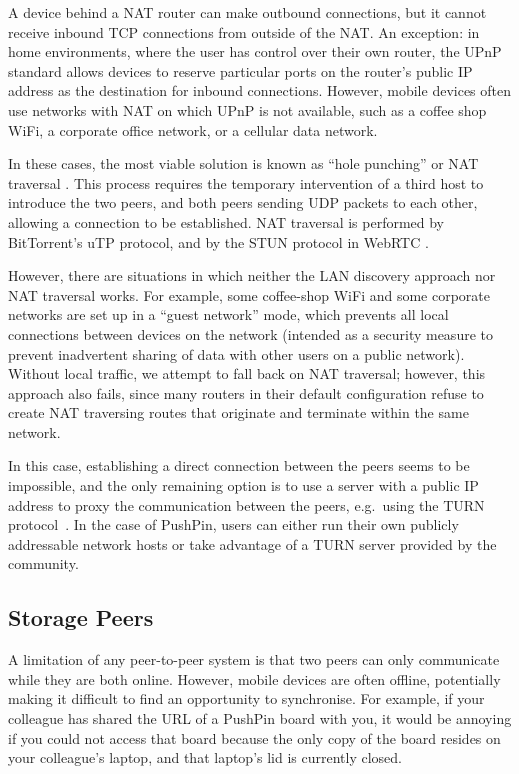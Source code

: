 \documentclass[sigplan,10pt]{acmart}
\begin{document}
A device behind a NAT router can make outbound connections, but it cannot receive inbound TCP connections from outside of the NAT.
An exception: in home environments, where the user has control over their own router, the UPnP standard allows devices to reserve particular ports on the router's public IP address as the destination for inbound connections.
However, mobile devices often use networks with NAT on which UPnP is not available, such as a coffee shop WiFi, a corporate office network, or a cellular data network.

In these cases, the most viable solution is known as ``hole punching'' or NAT traversal \cite{RFC5389}.
This process requires the temporary intervention of a third host to introduce the two peers, and both peers sending UDP packets to each other, allowing a connection to be established.
NAT traversal is performed by BitTorrent's uTP\cite{BEP29} protocol, and by the STUN protocol in WebRTC \cite{RFC5389}.

However, there are situations in which neither the LAN discovery approach nor NAT traversal works.
For example, some coffee-shop WiFi and some corporate networks are set up in a ``guest network'' mode, which prevents all local connections between devices on the network (intended as a security measure to prevent inadvertent sharing of data with other users on a public network).
Without local traffic, we attempt to fall back on NAT traversal; however, this approach also fails, since many routers in their default configuration refuse to create NAT traversing routes that originate and terminate within the same network.

In this case, establishing a direct connection between the peers seems to be impossible, and the only remaining option is to use a server with a public IP address to proxy the communication between the peers, e.g.\ using the TURN protocol~\cite{RFC5766}.
In the case of PushPin, users can either run their own publicly addressable network hosts or take advantage of a TURN server provided by the community.

\subsection{Storage Peers}

A limitation of any peer-to-peer system is that two peers can only communicate while they are both online.
However, mobile devices are often offline, potentially making it difficult to find an opportunity to synchronise.
For example, if your colleague has shared the URL of a PushPin board with you, it would be annoying if you could not access that board because the only copy of the board resides on your colleague's laptop, and that laptop's lid is currently closed.
\end{document}
